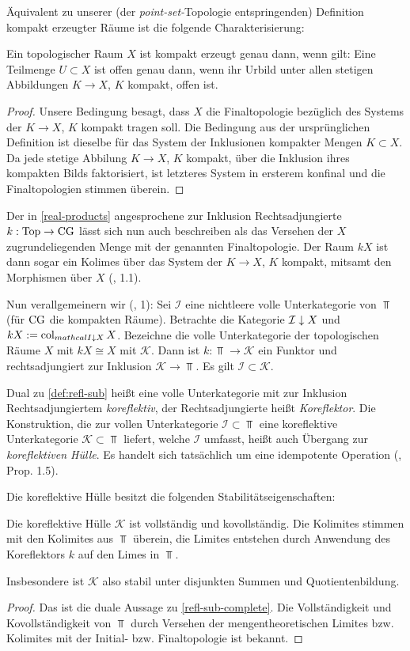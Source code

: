 Äquivalent zu unserer (der \emph{point-set-}Topologie entspringenden)
Definition kompakt erzeugter Räume ist die folgende Charakterisierung:
\begin{lemma}
  Ein topologischer Raum $X$ ist kompakt erzeugt genau dann, wenn
  gilt: Eine Teilmenge $U \subset X$ ist offen genau dann, wenn ihr
  Urbild unter allen stetigen Abbildungen $K \to X$, $K$ kompakt,
  offen ist.
\end{lemma}
\begin{proof}
  Unsere Bedingung besagt, dass $X$ die Finaltopologie bezüglich des
  Systems der $K \to X$, $K$ kompakt tragen soll. Die Bedingung aus
  der ursprünglichen Definition ist dieselbe für das System der
  Inklusionen kompakter Mengen $K \subset X$. Da jede stetige Abbilung
  $K \to X$, $K$ kompakt, über die Inklusion ihres kompakten Bilds
  faktorisiert, ist letzteres System in ersterem konfinal und die
  Finaltopologien stimmen überein.
\end{proof}
Der in \ref{real-products} angesprochene zur Inklusion
Rechtsadjungierte $k: \operatorname{Top} \to \operatorname{CG}$ lässt sich nun auch beschreiben
als das Versehen der $X$ zugrundeliegenden Menge mit der genannten
Finaltopologie. Der Raum $kX$ ist dann sogar ein Kolimes über das
System der $K \to X$, $K$ kompakt, mitsamt den Morphismen über $X$
(\cite{Vogt}, 1.1).

Nun verallgemeinern wir (\cite{Vogt}, 1): Sei $\mathcal{I}$ eine
nichtleere volle Unterkategorie von $\Top$ (für $\operatorname{CG}$ die kompakten
Räume). Betrachte die Kategorie $\mathcal{I} \downarrow \! {\scriptstyle } \, X$ und $kX
:= \operatorname{col}_{mathcal{I} \downarrow \! {\scriptstyle } \, X} X$. Bezeichne die volle
Unterkategorie der topologischen Räume $X$ mit $kX \cong X$ mit
$\mathcal{K}$. Dann ist $k: \Top \to \mathcal{K}$ ein Funktor und
rechtsadjungiert zur Inklusion $\mathcal{K} \to \Top$. Es gilt
$\mathcal{I} \subset \mathcal{K}$.
\begin{bem} \label{corefl}
  Dual zu \ref{def:refl-sub} heißt eine volle Unterkategorie mit zur
  Inklusion Rechtsadjungiertem \emph{koreflektiv}, der
  Rechtsadjungierte heißt \emph{Koreflektor}. Die Konstruktion, die
  zur vollen Unterkategorie $\mathcal{I} \subset \Top$ eine
  koreflektive Unterkategorie $\mathcal{K} \subset \Top$ liefert,
  welche $\mathcal{I}$ umfasst, heißt auch Übergang zur
  \emph{koreflektiven Hülle}. Es handelt sich tatsächlich um eine
  idempotente Operation (\cite{Vogt}, Prop. 1.5).
\end{bem}
Die koreflektive Hülle besitzt die folgenden Stabilitätseigenschaften:
\begin{prop} \label{k-complete}
  Die koreflektive Hülle $\mathcal{K}$ ist vollständig und
  kovollständig. Die Kolimites stimmen mit den Kolimites aus $\Top$
  überein, die Limites entstehen durch Anwendung des Koreflektors $k$
  auf den Limes in $\Top$.
\end{prop}
Insbesondere ist $\mathcal{K}$ also stabil unter disjunkten Summen und
Quotientenbildung.
\begin{proof}
  Das ist die duale Aussage zu \ref{refl-sub-complete}. Die
  Vollständigkeit und Kovollständigkeit von $\Top$ durch Versehen der
  mengentheoretischen Limites bzw. Kolimites mit der Initial-
  bzw. Finaltopologie ist bekannt.
\end{proof}

